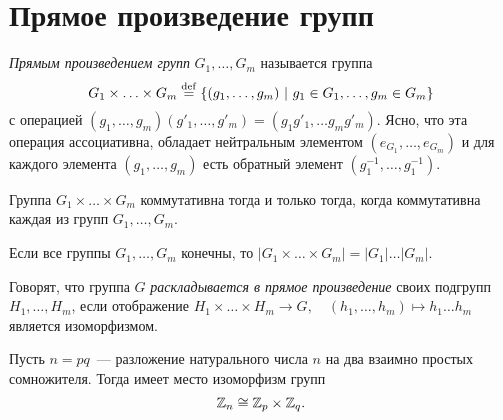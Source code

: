 \newpage
	\section{Прямое произведение групп}
	\setcounter{definition}{0}
	\begin{definition}
		\textit{Прямым произведением групп} $G_1, \ldots, G_m$ называется группа
		\begin{equation*}
			G_1 \times \ldots \times G_m \stackrel{\mathrm{def}}{=} \{(g_1, \ldots, g_m) \ | \ g_1 \in G_1, \ldots, g_m \in G_m\}
		\end{equation*}
		с операцией $(g_1, \ldots, g_m)(g'_1, \ldots, g'_m) = (g_1g'_1, \ldots g_mg'_m).$ \n
		Ясно, что эта операция ассоциативна, обладает нейтральным элементом $(e_{G_1}, \ldots, e_{G_m})$ и для каждого элемента $(g_1, \ldots, g_m)$ есть обратный элемент $(g^{-1}_1, \ldots, g^{-1}_1).$
	\end{definition}
	\begin{remark}
		Группа $G_1 \times \ldots \times G_m$ коммутативна тогда и только тогда, когда коммутативна каждая из групп $G_1, \ldots, G_m.$
	\end{remark}
	\begin{remark}
		Если все группы ${G_1, \ldots, G_m}$ конечны, то ${|G_1 \times \ldots \times G_m| = |G_1| \ldots |G_m|.}$
	\end{remark}
	\begin{definition}
		Говорят, что группа $G$ \textit{раскладывается в прямое произведение} своих подгрупп ${H_1, \ldots, H_m}$, если отображение
		${H_1 \times \ldots \times H_m \rightarrow G, \quad (h_1, \ldots, h_m) \mapsto h_1 \ldots h_m}$ является изоморфизмом.
	\end{definition}
	\begin{theorem}
		Пусть ${n = pq}$~--- разложение натурального числа $n$ на два взаимно простых сомножителя. Тогда имеет место изоморфизм групп
		\begin{equation*}
			\mathbb{Z}_n \cong \mathbb{Z}_p \times \mathbb{Z}_q.
		\end{equation*}
	\end{theorem}
	\newpage
